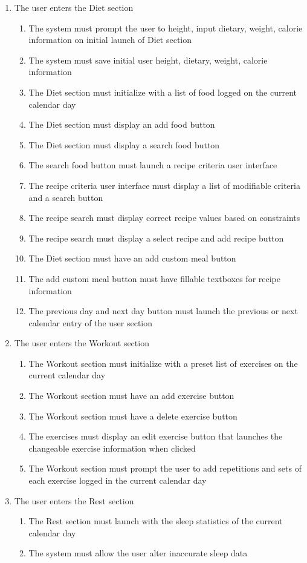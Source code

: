 \documentclass[12pt,letterpaper]{article}
\begin{document}
\begin{enumerate}[{BE}1.]
\item The user enters the Diet section
\begin{enumerate}[resume*]
	\item  The system must prompt the user to height, input dietary, weight,  calorie information on initial launch of Diet section
	\item  The system must save initial user height, dietary, weight, calorie information
	\item  The Diet section must initialize with a list of food logged on the current calendar day
	\item  The Diet section must display an add food button
	\item  The Diet section must display a search food button
	\item  The search food button must launch a recipe criteria user interface
	\item  The recipe criteria user interface must display a list of modifiable criteria and a search button
	\item  The recipe search must display correct recipe values based on constraints
	\item  The recipe search must display a select recipe and add recipe button
	\item  The Diet section must have an add custom meal button
	\item  The add custom meal button must have fillable textboxes for recipe information
	\item  The previous day and next day button must launch the previous or next calendar entry of the user section
\end{enumerate}

\item The user enters the Workout section
\begin{enumerate}[resume*]
	\item  The Workout section must initialize with a preset list of exercises on the current calendar day
	\item  The Workout section must have an add exercise button
	\item  The Workout section must have a delete exercise button
	\item  The exercises must display an edit exercise button that launches the changeable exercise information when clicked
	\item  The Workout section must prompt the user to add repetitions and sets of each exercise logged in the current calendar day
\end{enumerate}

\item The user enters the Rest section
\begin{enumerate}[resume*]
	\item  The Rest section must launch with the sleep statistics of the current calendar day
	\item  The system must allow the user alter inaccurate sleep data
\end{enumerate}
\end{enumerate}
\end{document}
